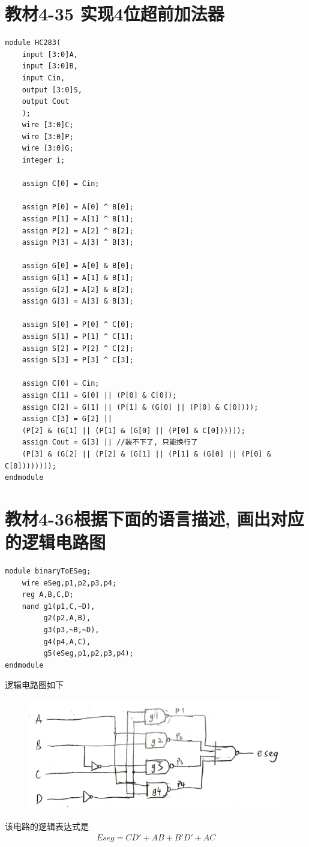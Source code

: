 \documentclass[fontset=windows,12pt]{article}
\begin{document}
\section{教材4-35 实现4位超前加法器}
    {\setmainfont{Courier New Bold}                          %
    \begin{lstlisting}
module HC283(
    input [3:0]A,
    input [3:0]B,
    input Cin,
    output [3:0]S,
    output Cout
    );
    wire [3:0]C;
    wire [3:0]P;
    wire [3:0]G;
    integer i;
    
    assign C[0] = Cin;
    
    assign P[0] = A[0] ^ B[0];
    assign P[1] = A[1] ^ B[1];
    assign P[2] = A[2] ^ B[2];
    assign P[3] = A[3] ^ B[3];
    
    assign G[0] = A[0] & B[0];
    assign G[1] = A[1] & B[1];
    assign G[2] = A[2] & B[2];
    assign G[3] = A[3] & B[3];
    
    assign S[0] = P[0] ^ C[0];
    assign S[1] = P[1] ^ C[1]; 
    assign S[2] = P[2] ^ C[2]; 
    assign S[3] = P[3] ^ C[3]; 
    
    assign C[0] = Cin;
    assign C[1] = G[0] || (P[0] & C[0]);
    assign C[2] = G[1] || (P[1] & (G[0] || (P[0] & C[0])));
    assign C[3] = G[2] || 
    (P[2] & (G[1] || (P[1] & (G[0] || (P[0] & C[0])))));
    assign Cout = G[3] || //装不下了, 只能换行了
    (P[3] & (G[2] || (P[2] & (G[1] || (P[1] & (G[0] || (P[0] & C[0])))))));
endmodule
    \end{lstlisting}}

\section{教材4-36根据下面的语言描述, 画出对应的逻辑电路图}
{\setmainfont{Courier New Bold}                          %
\begin{lstlisting}
module binaryToESeg;
    wire eSeg,p1,p2,p3,p4;
    reg A,B,C,D;
    nand g1(p1,C,~D),
         g2(p2,A,B),
         g3(p3,~B,~D),
         g4(p4,A,C),
         g5(eSeg,p1,p2,p3,p4);
endmodule
\end{lstlisting}}
逻辑电路图如下
\begin{figure}[ht]
    \centering
    \includegraphics[width=1\textwidth]{binarytoeseg.jpg}
    \label{3to8decoder}
\end{figure}\par
该电路的逻辑表达式是
\begin{align*}
    Eseg = CD'+ AB + B'D' + AC
\end{align*}
\end{document}
